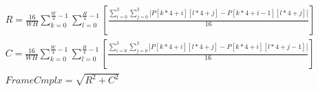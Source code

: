\documentclass[12pt,fleqn,landscape]{article}
\begin{document}
\begin{gather*}
R=\frac{16}{WH}\sum_{k=0}^{\frac{W}{4}-1}\sum_{l=0}^{\frac{H}{4}-1} \left[\frac{\sum_{i=0}^3\sum_{j=0}^3|P[k*4+i][l*4+j]-P[k*4+i-1][l*4+j]|}{16}\right]\\
C=\frac{16}{WH}\sum_{k=0}^{\frac{W}{4}-1}\sum_{l=0}^{\frac{H}{4}-1} \left[\frac{\sum_{i=0}^3\sum_{j=0}^3|P[k*4+i][l*4+j]-P[k*4+i][l*4+j-1]|}{16}\right]\\
FrameCmplx=\sqrt{R^2 + C^2}\\
\end{gather*}
\end{document}
